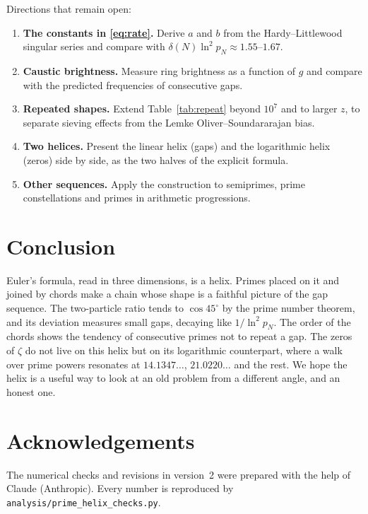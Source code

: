 \documentclass[11pt,a4paper]{article}
\theoremstyle{remark}
\theoremstyle{definition}
\newcommand{\dg}{^\circ}
\begin{document}
Directions that remain open:
\begin{enumerate}[nosep]
\item \textbf{The constants in \eqref{eq:rate}.} Derive $a$ and $b$ from the Hardy--Littlewood singular series and compare with $\delta(N)\ln^2p_N\approx1.55$--$1.67$.
\item \textbf{Caustic brightness.} Measure ring brightness as a function of $g$ and compare with the predicted frequencies of consecutive gaps.
\item \textbf{Repeated shapes.} Extend Table~\ref{tab:repeat} beyond $10^7$ and to larger $z$, to separate sieving effects from the Lemke Oliver--Soundararajan bias.
\item \textbf{Two helices.} Present the linear helix (gaps) and the logarithmic helix (zeros) side by side, as the two halves of the explicit formula.
\item \textbf{Other sequences.} Apply the construction to semiprimes, prime constellations and primes in arithmetic progressions.
\end{enumerate}

\section{Conclusion}
Euler's formula, read in three dimensions, is a helix. Primes placed on it and joined by chords make a chain whose shape is a faithful picture of the gap sequence. The two-particle ratio tends to $\cos45\dg$ by the prime number theorem, and its deviation measures small gaps, decaying like $1/\ln^2p_N$. The order of the chords shows the tendency of consecutive primes not to repeat a gap. The zeros of $\zeta$ do not live on this helix but on its logarithmic counterpart, where a walk over prime powers resonates at $14.1347\ldots$, $21.0220\ldots$ and the rest. We hope the helix is a useful way to look at an old problem from a different angle, and an honest one.

\section*{Acknowledgements}
The numerical checks and revisions in version~2 were prepared with the help of Claude (Anthropic). Every number is reproduced by \texttt{analysis/prime\_helix\_checks.py}.

\appendix
\end{document}
